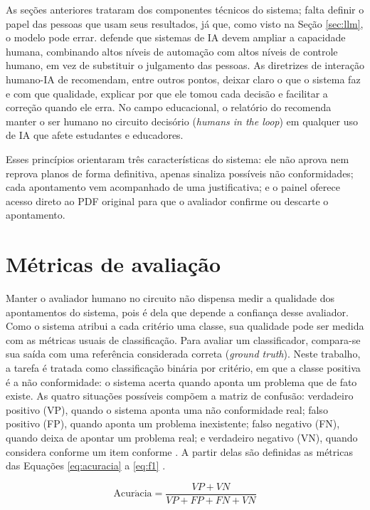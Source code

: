 As seções anteriores trataram dos componentes técnicos do sistema; falta definir o papel das pessoas que usam seus resultados, já que, como visto na Seção \ref{sec:llm}, o modelo pode errar.  defende que sistemas de IA devem ampliar a capacidade humana, combinando altos níveis de automação com altos níveis de controle humano, em vez de substituir o julgamento das pessoas. As diretrizes de interação humano-IA de  recomendam, entre outros pontos, deixar claro o que o sistema faz e com que qualidade, explicar por que ele tomou cada decisão e facilitar a correção quando ele erra. No campo educacional, o relatório do  recomenda manter o ser humano no circuito decisório (\textit{humans in the loop}) em qualquer uso de IA que afete estudantes e educadores.

Esses princípios orientaram três características do sistema: ele não aprova nem reprova planos de forma definitiva, apenas sinaliza possíveis não conformidades; cada apontamento vem acompanhado de uma justificativa; e o painel oferece acesso direto ao PDF original para que o avaliador confirme ou descarte o apontamento.

\section{Métricas de avaliação}
\label{sec:metricas}

Manter o avaliador humano no circuito não dispensa medir a qualidade dos apontamentos do sistema, pois é dela que depende a confiança desse avaliador. Como o sistema atribui a cada critério uma classe, sua qualidade pode ser medida com as métricas usuais de classificação. Para avaliar um classificador, compara-se sua saída com uma referência considerada correta (\textit{ground truth}). Neste trabalho, a tarefa é tratada como classificação binária por critério, em que a classe positiva é a não conformidade: o sistema acerta quando aponta um problema que de fato existe. As quatro situações possíveis compõem a matriz de confusão: verdadeiro positivo (VP), quando o sistema aponta uma não conformidade real; falso positivo (FP), quando aponta um problema inexistente; falso negativo (FN), quando deixa de apontar um problema real; e verdadeiro negativo (VN), quando considera conforme um item conforme \cite{Sokolova2009}. A partir delas são definidas as métricas das Equações \ref{eq:acuracia} a \ref{eq:f1} \cite{Sokolova2009}.

\begin{equation}
\label{eq:acuracia}
\mathrm{Acur\acute{a}cia} = \frac{VP + VN}{VP + FP + FN + VN}
\end{equation}

